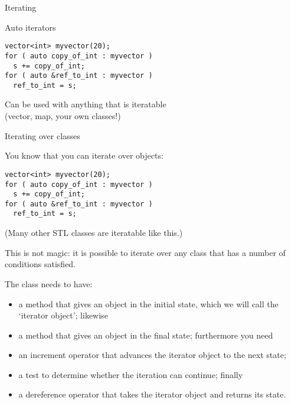 \begin{comment}
  \begin{block}{Auto plus}
    \label{sl:auto-plus-const}
    Keywords like \n{const} and the reference character~\n{\&} can be
    added:
\begin{verbatim}
// class member
  some_object my_object;
// class method:
  some_object &get_some_object() { return my_object; };
// main program:
auto object_copy  = thing.get_some_object();
auto &object_mutable  = thing.get_some_object();
const auto &object_immutable  = thing.get_some_object();
\end{verbatim}
  \end{block}
\end{comment}

 {Iterating}

\begin{block}{Auto iterators}
  \label{sl:auto-iterator}
\begin{verbatim}
vector<int> myvector(20);
for ( auto copy_of_int : myvector )
  s += copy_of_int;
for ( auto &ref_to_int : myvector )
  ref_to_int = s;
\end{verbatim}
Can be used with anything that is iteratable\\
(vector, map, your own classes!)
\end{block}

 {Iterating over classes}
\label{sec:range-iter}

You know that you can iterate over  objects:
\begin{verbatim}
vector<int> myvector(20);
for ( auto copy_of_int : myvector )
  s += copy_of_int;
for ( auto &ref_to_int : myvector )
  ref_to_int = s;
\end{verbatim}
(Many other \ac{STL} classes are iteratable like this.)

This is not magic: it is possible to iterate over any class
 that has a number of conditions satisfied.

The class needs to have:
\begin{itemize}
\item a method  that gives an
  object in the initial state, which we will call the `iterator object'; likewise
\item a method  that gives an 
  object in the final state; furthermore you need
\item an increment operator  that
  advances the iterator object to the next state;
\item a test  to determine
  whether the iteration can continue; finally
\item a dereference operator  that takes the
  iterator object and returns its state.
\end{itemize}

